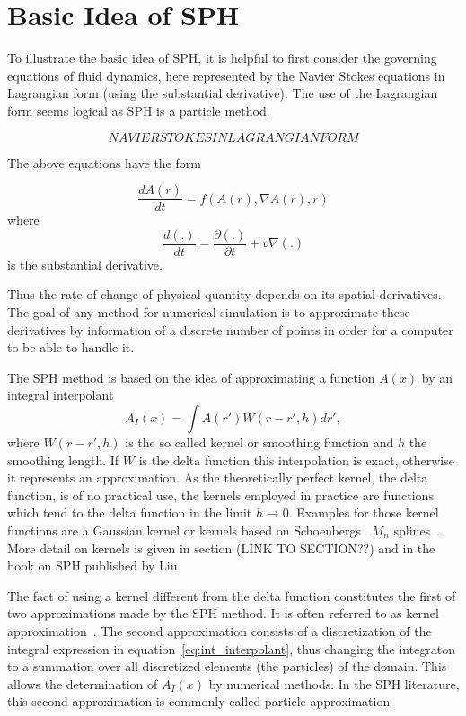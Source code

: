 \documentclass{report}
\begin{document}
\section{Basic Idea of SPH}
\label{sec:BasicsSPH}

To illustrate the basic idea of SPH, it is helpful to first consider the
governing equations of fluid dynamics, here represented by the Navier Stokes equations in
Lagrangian form (using the substantial derivative). The use of the Lagrangian form seems logical as SPH is a
particle method.

\begin {equation}
NAVIER STOKES IN LAGRANGIAN FORM
\end {equation}

The above equations have the form~\cite{Monaghan2005}

\begin {equation}
\label{eq:EFD_form}
{\frac{dA(r)}{dt}}=f(A(r),\nabla A(r),r)
\end {equation}
where
\begin {equation}
{\frac{d(.)}{dt}}={\frac{\partial(.)}{ \partial t}}+v\nabla(.)
\end{equation}
is the substantial derivative.

Thus the rate of change of  physical quantity depends on its spatial
derivatives. The goal of any method for numerical simulation is to approximate
these derivatives by information of a discrete number of points in order for a
computer to be able to handle it. 


The SPH method is based on the idea of approximating a function $A(x)$ by an
integral interpolant
\begin{equation}
\label{eq:int_interpolant}
A_I(x)=\int A(r')W(r-r',h)dr',
\end{equation}
where $W(r-r',h)$ is the so called kernel or smoothing function and $h$ the
smoothing length. If $W$ is the delta function this interpolation is exact,
otherwise it represents an approximation. As the theoretically
perfect kernel, the delta function, is of no practical use, the kernels
employed in practice are functions which tend to the delta function in the 
limit $h\rightarrow 0$.
Examples for those kernel functions are a Gaussian kernel or
kernels based on Schoenbergs~\cite{Schoenberg1946} $M_n$ splines~\cite{Monaghan2005}.
More detail on kernels is given in section
(LINK TO SECTION??) and in the book on SPH published by Liu~\cite{Liu2003}

The fact of using a kernel different from the delta function constitutes the
first of two approximations made by the SPH
method. It is often referred to as kernel approximation~\cite{Liu2003}.
The second approximation consists of a discretization of the integral
expression in equation~\ref{eq:int_interpolant}, thus changing the integraton
to a summation over all discretized elements (the particles) of the domain. 
This allows the determination of $A_I(x)$ by numerical methods. In the SPH
literature, this second approximation is commonly called particle
approximation~\cite{Liu2003}
\end{document}
